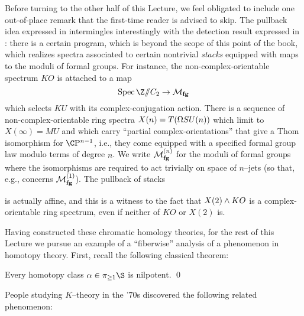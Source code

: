 \begin{remark}\label{RemovingStackinessFromSpectra}
Before turning to the other half of this Lecture, we feel obligated to include one out-of-place remark that the first-time reader is advised to skip.  The pullback idea expressed in  intermingles interestingly with the detection result expressed in : there is a certain program, which is beyond the scope of this point of the book, which realizes spectra associated to certain nontrivial \emph{stacks} equipped with maps to the moduli of formal groups.  For instance, the non-complex-orientable spectrum $KO$ is attached to a map \[\Spec \Z \mmod C_2 \to \moduli{fg}\] which selects $KU$ with its complex-conjugation action.  There is a sequence of non-complex-orientable ring spectra $X(n) = T(\Omega SU(n))$ which limit to $X(\infty) = MU$ and which carry ``partial complex-orientations'' that give a Thom isomorphism for $\CP^{n-1}$, i.e., they come equipped with a specified formal group law modulo terms of degree $n$.  We write $\mathcal{M}_{\mathbf{fg}}^{(n)}$ for the moduli of formal groups where the isomorphisms are required to act trivially on space of $n$--jets (so that, e.g.,  concerns $\mathcal{M}_{\mathbf{fg}}^{(1)}$).  The pullback of stacks
\begin{center}
\end{center}
is actually affine, and this is a witness to the fact that $X(2) \wedge KO$ is a complex-orientable ring spectrum, even if neither of $KO$ or $X(2)$ is.
\end{remark}

Having constructed these chromatic homology theories, for the rest of this Lecture we pursue an example of a ``fiberwise'' analysis of a phenomenon in homotopy theory.  First, recall the following classical theorem:

\begin{theorem}
Every homotopy class $\alpha \in \pi_{\ge 1} \S$ is nilpotent. \qed
\end{theorem}

\noindent People studying $K$--theory in the '$70$s discovered the following related phenomenon:

